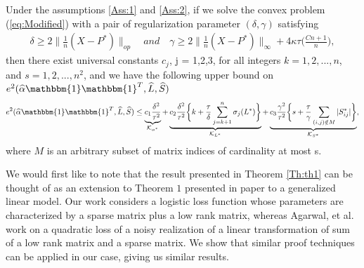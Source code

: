 \documentclass[AMS,STIX1COL]{WileyNJD-v2}
\begin{document}
{\begin{theorem} \label{Th:th1}
Under the assumptions \ref{Ass:1} and \ref{Ass:2},
if we solve the convex problem (\ref{eq:Modified}) with a pair of regularization parameter $(\delta,\gamma)$ satisfying
\begin{align} \label{eq:49}
\delta \geq 2\|\frac{1}{n}(X-P^{*})\|_{op} \quad and \quad \gamma \geq 2\|\frac{1}{n}(X-P^{*})\|_{\infty}+4\kappa\tau\bigg(\frac{Cn+1}{n} \bigg),
\end{align}
then there exist universal constants $c_{j}$, j = 1,2,3,  for all integers $k = 1,2,...,n$, and $s = 1,2,...,n^{2}$, and we have the following upper bound on $e^{2}(\widehat{\alpha}\mathbbm{1}\mathbbm{1}^T,\widehat{L},\widehat{S})$
\begin{align}
    e^{2}(\widehat{\alpha}\mathbbm{1}\mathbbm{1}^T,\widehat{L},\widehat{S}) \leq
    \underbrace{c_{1}\frac{\delta^{2}}{\tau^{2}}}
    _{\mathcal{K}_{\alpha^*}} +
    \underbrace{c_{2}\frac{\delta^{2}}{\tau^{2}}
    \bigg\{k + \frac{\tau}{\delta}\sum_{j=k+1}^{n}\sigma_{j}(L^{*})\bigg\}}_{\mathcal{K}_{L^*}} +
    \underbrace{c_{3}\frac{\gamma^{2}}{\tau^{2}}
    \bigg\{s + \frac{\tau}{\gamma}\sum_{(i,j) \notin M}|S^*_{ij}|\bigg\}}_{\mathcal{K}_{S^*}},
\end{align}
where $M$ is an arbitrary subset of matrix indices of cardinality at most s.
\end{theorem}

We would first like to note that the result presented in Theorem \ref{Th:th1} can be thought of as an extension to Theorem $1$ presented in paper \cite{agarwal2012noisy} to a generalized linear model.
Our work considers a logistic loss function whose parameters are characterized by a sparse matrix plus a low rank matrix, whereas Agarwal, et al.\cite{agarwal2012noisy} work on a quadratic loss of a noisy realization of a linear transformation of sum of a low rank matrix and a sparse matrix.
We show that similar proof techniques can be applied in our case, giving us similar results.

}
\end{document}
